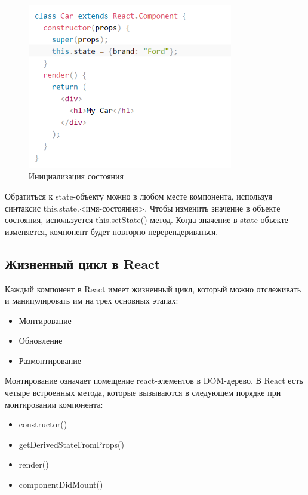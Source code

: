 \documentclass[a4paper,12pt]{diplom}
\begin{document}
\begin{figure}[!ht]
	\centering
	\includegraphics[width=0.8\textwidth]{resources/state.png}
	\caption{Инициализация состояния}
	\label{b}
\end{figure}

Обратиться к state-объекту можно в любом месте компонента, используя синтаксис this.state.<имя-состояния>. Чтобы изменить значение в объекте состояния, используется this.setState() метод.
Когда значение в state-объекте изменяется, компонент будет повторно перерендериваться.

\subsection{Жизненный цикл в React}

Каждый компонент в React имеет жизненный цикл, который можно отслеживать и манипулировать им на трех основных этапах:

\begin{itemize}
  \item Монтирование
  \item Обновление
  \item Размонтирование
\end{itemize}

Монтирование означает помещение react-элементов в DOM-дерево. В React есть четыре встроенных метода, которые вызываются в следующем порядке при монтировании компонента:

\begin{itemize}
  \item constructor()
  \item getDerivedStateFromProps()
  \item render()
  \item componentDidMount()
\end{itemize}
\end{document}
